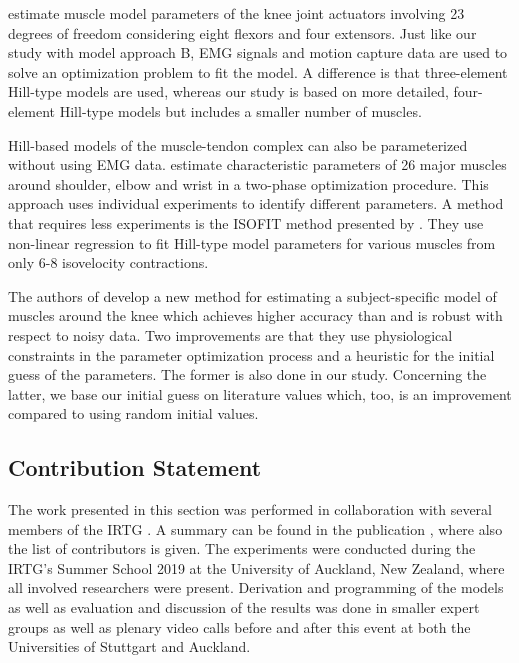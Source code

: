 \cite{Falisse2016} estimate muscle model parameters of the knee joint actuators involving 23 degrees of freedom considering eight flexors and four extensors. Just like our study with model approach B, EMG signals and motion capture data are used to solve an optimization problem to fit the model. A difference is that three-element Hill-type models are used, whereas our study is based on more detailed, four-element Hill-type models but includes a smaller number of muscles.

Hill-based models of the muscle-tendon complex can also be parameterized without using EMG data.
\cite{Garner2003} estimate characteristic parameters of 26 major muscles around shoulder, elbow and  wrist in a two-phase optimization procedure. This approach uses individual experiments to identify different parameters. A method that requires less experiments is the ISOFIT method presented by \cite{Wagner2005}. They use non-linear regression to fit Hill-type model parameters for various muscles from only 6-8 isovelocity contractions.

The authors of \cite{Campen2014} develop a new method for estimating a subject-specific model of muscles around the knee which achieves higher accuracy than \cite{Garner2003} and is robust with respect to noisy data. Two improvements are that they use physiological constraints in the parameter optimization process and a heuristic for the initial guess of the parameters. The former is also done in our study. Concerning the latter, we base our initial guess on literature values which, too, is an improvement compared to using random initial values.

\subsection{Contribution Statement}

The work presented in this section was performed in collaboration with several members of the IRTG . A summary can be found in the publication \cite{summerschool2019}, where also the list of contributors is given.
The experiments were conducted during the IRTG's Summer School 2019 at the University of Auckland, New Zealand, where all involved researchers were present. Derivation and programming of the models as well as evaluation and discussion of the results was done in smaller expert groups as well as plenary video calls before and after this event at both the Universities of Stuttgart and Auckland.


